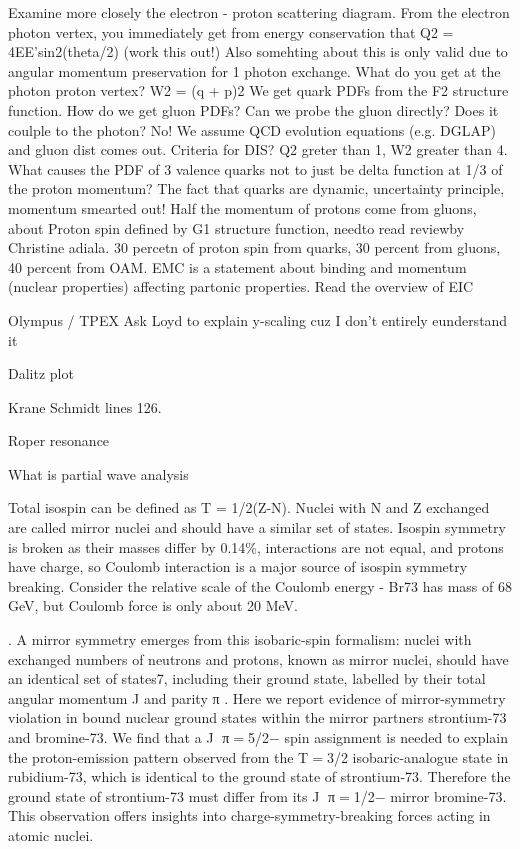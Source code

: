 Examine more closely the electron - proton scattering diagram. From the electron photon vertex, you immediately get from energy conservation that Q2 = 4EE'sin2(theta/2) (work this out!) Also somehting about this is only valid due to angular momentum preservation for 1 photon exchange. 
What do you get at the photon proton vertex? W2 = (q + p)2 
We get quark PDFs from the F2 structure function. How do we get gluon PDFs? Can we probe the gluon directly? Does it coulple to the photon? No! We assume QCD evolution equations (e.g. DGLAP) and gluon dist comes out. 
Criteria for DIS? Q2 greter than 1, W2 greater than 4. 
What causes the PDF of 3 valence quarks not to just be delta function at 1/3 of the proton momentum? The fact that quarks are dynamic, uncertainty principle, momentum smearted out!
Half the momentum of protons come from gluons, about
Proton spin defined by G1 structure function, needto read reviewby Christine adiala. 30 percetn of proton spin from quarks, 30 percent from gluons, 40 percent from OAM. 
EMC is a statement about binding and momentum (nuclear properties) affecting partonic properties. 
Read the overview of EIC

Olympus / TPEX
Ask Loyd to explain y-scaling cuz I don’t entirely eunderstand it

Dalitz plot 

Krane Schmidt lines 126.

Roper resonance

What is partial wave analysis

Total isospin can be defined as T = 1/2(Z-N). Nuclei with N and Z exchanged are called mirror nuclei and should have a similar set of states. Isospin symmetry is broken as their masses differ by 0.14\%, interactions are not equal, and protons have charge, so Coulomb interaction is a major source of isospin symmetry breaking. Consider the relative scale of the Coulomb energy - Br73 has mass of 68 GeV, but Coulomb force is only about 20 MeV. 

. A mirror symmetry emerges from this isobaric-spin formalism: nuclei with exchanged numbers of neutrons and protons, known as mirror nuclei, should have an identical set of states7, including their ground state, labelled by their total angular momentum J and parity π . Here we report evidence of mirror-symmetry violation in bound nuclear ground states within the mirror partners strontium-73 and bromine-73. We find that a J π=5/2− spin assignment is needed to explain the proton-emission pattern observed from the T=3/2 isobaric-analogue state in rubidium-73, which is identical to the ground state of strontium-73. Therefore the ground state of strontium-73 must differ from its J π=1/2− mirror bromine-73. This observation offers insights into charge-symmetry-breaking forces acting in atomic nuclei.
         
